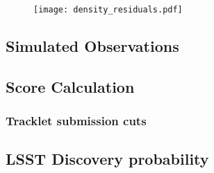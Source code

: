 \begin{figure}[htb]
    \centering
    \texttt{[image: density\_residuals.pdf]}
    \caption{}
    \label{fig:density_residuals}
\end{figure}

\subsection{Simulated Observations}


\subsection{\dig{} Score Calculation}
\subsubsection{Tracklet submission cuts}


\subsection{LSST Discovery probability}
\todo{}
